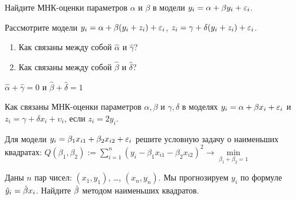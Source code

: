 \documentclass[pdftex,11pt,openany]{book}\usepackage[]{graphicx}\usepackage[]{color}
\begin{document}
\begin{problem}
 Найдите МНК-оценки параметров $\alpha$ и $\beta$ в модели $y_i = \alpha + \beta y_i + \varepsilon_i$.
\end{problem}

\begin{solution}
\end{solution}

\begin{problem}
 Рассмотрите модели $y_i = \alpha + \beta (y_i + z_i) + \varepsilon_i$, $z_i = \gamma + \delta(y_i+z_i) + \varepsilon_i$. 
\begin{enumerate}
\item Как связаны между собой $\hat{\alpha}$ и $\hat{\gamma}$?
\item  Как связаны между собой $\hat{\beta}$ и $\hat{\delta}$?
\end{enumerate} 
\end{problem}

\begin{solution}
$\hat{\alpha} + \hat{\gamma} = 0$ и $\hat{\beta} + \hat{\delta} = 1$
\end{solution}



\begin{problem}
 Как связаны МНК-оценки параметров $\alpha, \beta$ и $\gamma, \delta$ в моделях $y_i = \alpha + \beta x_i + \varepsilon_i$ и $z_i = \gamma + \delta x_i + \upsilon_i$, если $z_i = 2 y_i$.
\end{problem}

\begin{solution}
\end{solution} 

\begin{problem}
 Для модели $y_i = \beta_1 x_{i1} + \beta_2 x_{i2} + \varepsilon_i$ решите условную задачу о наименьших квадратах: $Q(\beta_1, \beta_2) := \sum_{i=1}^n (y_i - \beta_1 x_{i1} - \beta_2 x_{i2})^2 \rightarrow \underset{\beta_1 + \beta_2 = 1}{\min}$
\end{problem}

\begin{solution}
\end{solution} 
 


\begin{problem}
Даны $n$ пар чисел: $(x_1, y_1)$, \ldots, $(x_n,y_n)$. Мы прогнозируем $y_i$ по формуле $\hat{y}_i=\hat{\beta} x_i$. Найдите $\hat{\beta}$ методом наименьших квадратов. 
\end{problem} 
\end{document}
